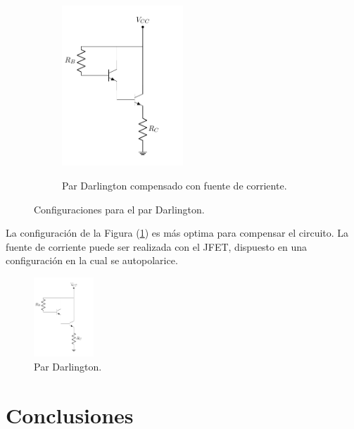 \begin{figure}[H]
\begin{subfigure}{.5\textwidth}
\centering
	\includegraphics[width=0.5\textwidth, page=3]{Imagenes/ParDarlington.pdf}
	\label{fig:pardar3}
	\caption{Par Darlington compensado con fuente de corriente.}
\end{subfigure}
\caption{Configuraciones para el par Darlington.}
\label{fig:pardar}
\end{figure}

La configuración de la Figura (\ref{fig:pardar3}) es más optima para compensar el circuito. La fuente de corriente puede ser realizada con el JFET, dispuesto en una configuración en la cual se autopolarice.
\begin{figure}[H]
\centering
	\includegraphics[width=0.2\textwidth, page=4]{Imagenes/ParDarlington.pdf}
	\caption{Par Darlington.}
	\label{fig:fuentei}
\end{figure}


\section{Conclusiones}
	
